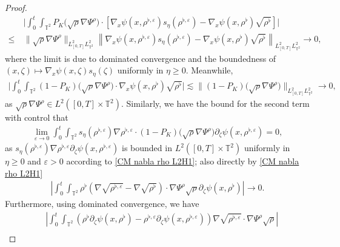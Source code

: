 \begin{proof}
\begin{align}
& \ \Big|\int_{0}^{t} \int_{\mathbb{T}^2} P_{K}\big(\sqrt{\rho} \nabla \Psi^{\rho}\big) \cdot \left[\nabla_x\psi(x, \rho^{\flat,\varepsilon}) s_{\eta}(\rho^{\flat,\varepsilon}) - \nabla_x\psi(x, \rho^{\flat}) \sqrt{\rho^{\flat}}\right]\Big| \nonumber\\
\leq & \ \|\sqrt{\rho} \nabla \Psi^{\rho}\|_{L^2_{[0,T]}L^2_{\mathbb{T}^2}}\left\|\nabla_x\psi(x, \rho^{\flat,\varepsilon}) s_{\eta}(\rho^{\flat,\varepsilon}) - \nabla_x\psi(x, \rho^{\flat}) \sqrt{\rho^{\flat}}\right\|_{L^2_{[0,T]}L^2_{\mathbb{T}^2}} \to 0, 
\end{align}
where the limit is due to dominated convergence and the boundedness of $(x, \zeta) \mapsto \nabla_x\psi(x, \zeta) s_{\eta}(\zeta)$ uniformly in $\eta \geq 0$. Meanwhile, 
\begin{align}\label{eq:conv-grho-12}
\Big|\int_{0}^{t} \int_{\mathbb{T}^2} (1 - P_{K})\big(\sqrt{\rho} \nabla \Psi^{\rho}\big) \cdot \nabla_x\psi(x, \rho^{\flat}) \sqrt{\rho^{\flat}}\Big| \lesssim \|(1 - P_{K})\big(\sqrt{\rho} \nabla \Psi^{\rho}\big)\|_{L^2_{[0,T]}L^2_{\mathbb{T}^2}} \to 0,
\end{align}
as $\sqrt{\rho} \nabla \Psi^{\rho} \in L^2([0,T] \times \mathbb{T}^2)$. Similarly, we have the bound for the second term with control that
\begin{align}\label{eq:conv-grho-21}
\lim_{\varepsilon \to 0} \int_{0}^{t} \int_{\mathbb{T}^2} s_{\eta}(\rho^{\flat,\varepsilon})\nabla\rho^{\flat,\varepsilon} \cdot (1 - P_{K}) \big(\sqrt{\rho} \nabla \Psi^{\rho}\big)\partial_\zeta\psi(x, \rho^{\flat,\varepsilon}) = 0,
\end{align}
as $s_{\eta}(\rho^{\flat,\varepsilon})\nabla\rho^{\flat,\varepsilon} \partial_\zeta\psi(x, \rho^{\flat,\varepsilon})$ is bounded in $L^2([0,T] \times \mathbb{T}^2)$ uniformly in $\eta \geq 0$ and $\varepsilon > 0$ according to \eqref{CM nabla rho L2H1}; also directly by \eqref{CM nabla rho L2H1}
\begin{align}\label{eq:conv-grho-22}
\left|\int_{0}^{t} \int_{\mathbb{T}^2} \rho^{\flat} \left(\nabla\sqrt{\rho^{\flat,\varepsilon}} -\nabla\sqrt{\rho^{\flat}}\right)\cdot \nabla \Psi^{\rho} \sqrt{\rho}\partial_\zeta\psi(x, \rho^{\flat})\right| \to 0.
\end{align}
Furthermore, using dominated convergence, we have
\begin{align}
& \ \left|\int_{0}^{t} \int_{\mathbb{T}^2} \left(\rho^{\flat}\partial_\zeta\psi(x, \rho^{\flat})-\rho^{\flat,\varepsilon}\partial_\zeta\psi(x, \rho^{\flat,\varepsilon})\right) \nabla\sqrt{\rho^{\flat,\varepsilon}}\cdot  \nabla \Psi^{\rho} \sqrt{\rho} \right| \nonumber\\

\end{align}
\end{proof}
